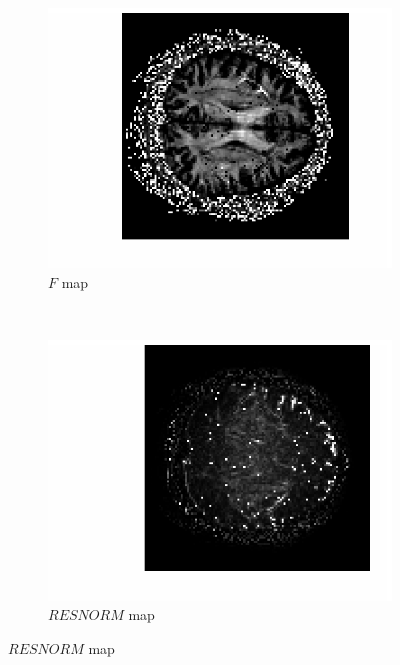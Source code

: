 \documentclass[11pt,a4paper,oneside]{report}
\begin{document}
\begin{figure}[H]
  \centering
  \begin{subfigure}[b]{0.5\textwidth}
      \centering
    \includegraphics[scale=1]{figures/q1/q114-F.eps}
    \caption{$F$ map}
    \label{q114-F}
  \end{subfigure}%
  ~
  \begin{subfigure}[b]{0.5\textwidth}
      \centering
    \includegraphics[scale=1]{figures/q1/q114-RESNORM.eps}
    \caption{$RESNORM$ map}
    \label{q114-RESNORM}
  \end{subfigure}%

\end{figure}
\end{document}
